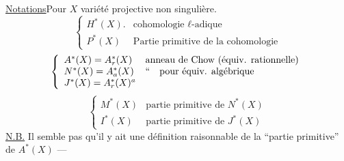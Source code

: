 \uline{Notations}\quad Pour \(X\) variété projective non singulière.
\[
\left\{\begin{array}{ll}
H^*(X).&\text{cohomologie }\ell\text{-adique}\\
P^*(X)&\text{Partie primitive de la cohomologie}
\end{array}\right.
\]
\[
\left\{\begin{array}{ll}
A^*(X)=A_r^*(X)&\text{anneau de Chow (équiv. rationnelle)}\\
N^*(X)=A_a^*(X)&\text{``\quad pour équiv. algébrique}\\
J^*(X)=A_r^*(X)^a&
\end{array}\right.
\]
\[
\left\{\begin{array}{ll}
M^*(X)&\text{partie primitive de }N^*(X)\\
I^*(X)&\text{partie primitive de }J^*(X)
\end{array}\right.
\]
\uline{N.B.} Il  semble pas qu'il y ait une définition raisonnable de la ``partie primitive'' de \(A^*(X)\) \(\text{---}\)
